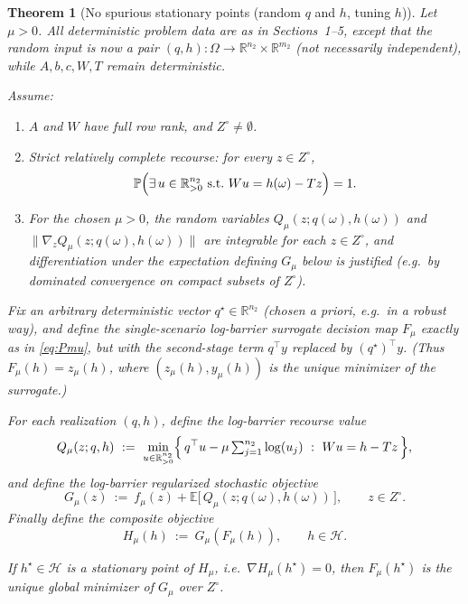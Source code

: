 \documentclass[11pt]{article}
\newcommand{\R}{\mathbb{R}}
\newcommand{\E}{\mathbb{E}}
\newcommand{\bbP}{\mathbb{P}}
\theoremstyle{plain}
\newtheorem{theorem}{Theorem}
\theoremstyle{definition}
\begin{document}
\begin{theorem}[No spurious stationary points (random $q$ and $h$, tuning $h$)]\label{thm:main}
Let $\mu>0$. All deterministic problem data are as in Sections~1--5, except that the
random input is now a pair $(q,h):\Omega\to\R^{n_2}\times\R^{m_2}$ (not necessarily independent),
while $A,b,c,W,T$ remain deterministic.

Assume:
\begin{enumerate}
\item[(a)] $A$ and $W$ have full row rank, and $Z^\circ\neq\emptyset$.
\item[(b)] \emph{Strict relatively complete recourse:} for every $z\in Z^\circ$,
\[
\bbP\Bigl(\exists\,u\in\R^{n_2}_{>0}\ \text{s.t.}\ W u = h(\omega)-Tz\Bigr)=1.
\]
\item[(c)] For the chosen $\mu>0$, the random variables
$Q_\mu(z;q(\omega),h(\omega))$ and $\|\nabla_z Q_\mu(z;q(\omega),h(\omega))\|$
are integrable for each $z\in Z^\circ$, and differentiation under the expectation defining
$G_\mu$ below is justified (e.g.\ by dominated convergence on compact subsets of $Z^\circ$).
\end{enumerate}

Fix an arbitrary deterministic vector $q^\star\in\R^{n_2}$ (chosen \emph{a priori}, e.g.\ in a robust way),
and define the \emph{single-scenario} log-barrier surrogate decision map $F_\mu$ exactly as in \eqref{eq:Pmu},
but with the second-stage term $q^\top y$ replaced by $(q^\star)^\top y$.
(Thus $F_\mu(h)=z_\mu(h)$, where $(z_\mu(h),y_\mu(h))$ is the unique minimizer of the surrogate.)

For each realization $(q,h)$, define the log-barrier recourse value
\[
Q_\mu(z;q,h)\ :=\ 
\min_{u\in\R^{n_2}_{>0}}
\Bigl\{\,q^\top u-\mu\textstyle\sum_{j=1}^{n_2}\log(u_j)\ :\ W u = h-Tz\,\Bigr\},
\]
and define the log-barrier regularized stochastic objective
\[
G_\mu(z)\ :=\ f_\mu(z)+\E\bigl[\,Q_\mu(z;q(\omega),h(\omega))\,\bigr],\qquad z\in Z^\circ.
\]
Finally define the composite objective
\[
H_\mu(h)\ :=\ G_\mu(F_\mu(h)),\qquad h\in \mathcal{H}.
\]

If $h^\star\in \mathcal{H}$ is a stationary point of $H_\mu$, i.e.\ $\nabla H_\mu(h^\star)=0$, then
$F_\mu(h^\star)$ is the unique global minimizer of $G_\mu$ over $Z^\circ$.
\end{theorem}
\end{document}
